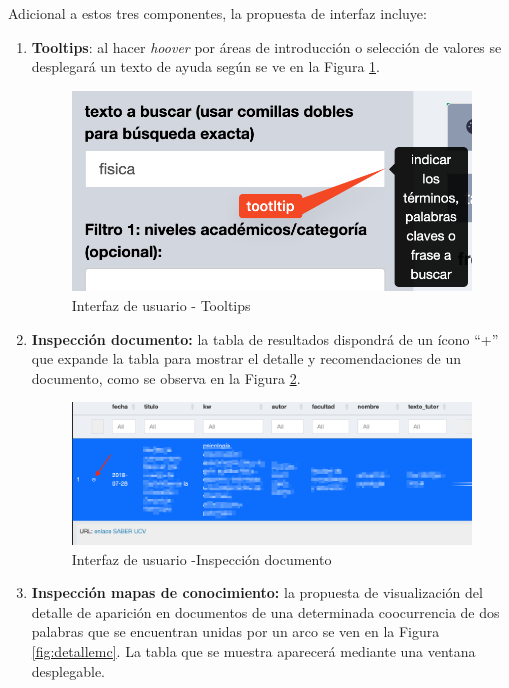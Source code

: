 \documentclass[
  12pt,
  openany]{book}
\begin{document}
Adicional a estos tres componentes, la propuesta de interfaz incluye:

\begin{enumerate}
\def\labelenumi{\arabic{enumi}.}
\item
  \textbf{Tooltips}: al hacer \emph{hoover} por áreas de introducción o selección de valores se desplegará un texto de ayuda según se ve en la Figura \ref{fig:tooltip}.

  \begin{figure}

  {\centering \includegraphics[width=0.3\linewidth]{images/05-desarrollo/4_ciclo/UI/tooltip} 

  }

  \caption{Interfaz de usuario - Tooltips }\label{fig:tooltip}
  \end{figure}
\item
  \textbf{Inspección documento:} la tabla de resultados dispondrá de un ícono ``+'' que expande la tabla para mostrar el detalle y recomendaciones de un documento, como se observa en la Figura \ref{fig:detalledoc}.

  \begin{figure}

  {\centering \includegraphics[width=0.8\linewidth]{images/05-desarrollo/4_ciclo/UI/uiinspecciontabla} 

  }

  \caption{Interfaz de usuario -Inspección documento }\label{fig:detalledoc}
  \end{figure}
\item
  \textbf{Inspección mapas de conocimiento:} la propuesta de visualización del detalle de aparición en documentos de una determinada coocurrencia de dos palabras que se encuentran unidas por un arco se ven en la Figura \ref{fig:detallemc}. La tabla que se muestra aparecerá mediante una ventana desplegable.


\end{enumerate}
\end{document}
